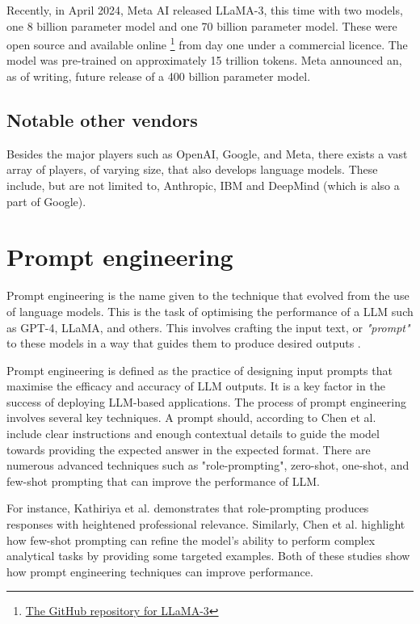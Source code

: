 Recently, in April 2024, Meta AI released LLaMA-3, this time with two models, one 8 billion parameter model and one 70 billion parameter model. These were open source and available online \footnote{\href{https://github.com/meta-llama/llama3}{The GitHub repository for LLaMA-3}} from day one under a commercial licence. The model was pre-trained on approximately 15 trillion tokens. Meta announced an, as of writing, future release of a 400 billion parameter model.


\subsection{Notable other vendors}


Besides the major players such as OpenAI, Google, and Meta, there exists a vast array of players, of varying size, that also develops language models. These include, but are not limited to, Anthropic, IBM and DeepMind (which is also a part of Google).


\section{Prompt engineering}
\label{sec:prompt_engineering}


Prompt engineering is the name given to the technique that evolved from the use of language models. This is the task of optimising the performance of a \gls{LLM} such as GPT-4, LLaMA, and others. This involves crafting the input text, or \textit{"prompt"} to these models in a way that guides them to produce desired outputs \cite{kathiriya_power_2023, chen_unleashing_2023}.


Prompt engineering is defined as the practice of designing input prompts that maximise the efficacy and accuracy of \gls{LLM} outputs. It is a key factor in the success of deploying \gls{LLM}-based applications. The process of prompt engineering involves several key techniques. A prompt should, according to Chen et al. include clear instructions and enough contextual details to guide the model towards providing the expected answer in the expected format. There are numerous advanced techniques such as "role-prompting", zero-shot, one-shot, and few-shot prompting that can improve the performance of \gls{LLM}.


For instance, Kathiriya et al. \cite{kathiriya_power_2023} demonstrates that role-prompting produces responses with heightened professional relevance. Similarly, Chen et al. highlight how few-shot prompting can refine the model's ability to perform complex analytical tasks by providing some targeted examples. Both of these studies show how prompt engineering techniques can improve performance.


